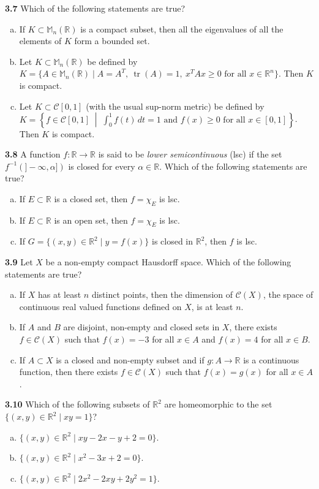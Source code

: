 \documentclass[11pt,a4paper]{article}
\newcommand{\R}{\mathbb{R}}
\newcommand{\M}{\mathbb{M}}
\newcommand{\tr}{\operatorname{tr}}
\newcommand{\qitem}[1]{\par\medskip\noindent\textbf{#1}\hspace{0.5em}}
\begin{document}
\qitem{3.7} Which of the following statements are true?
\begin{enumerate}[a.]
  \item If $K \subset \M_n(\R)$ is a compact subset, then all the eigenvalues of all the elements of $K$ form a bounded set.
  \item Let $K \subset \M_n(\R)$ be defined by $K = \{A \in \M_n(\R) \mid A = A^T,\ \tr(A) = 1,\ x^T A x \ge 0 \text{ for all } x \in \R^n\}$. Then $K$ is compact.
  \item Let $K \subset \mathcal{C}[0, 1]$ (with the usual sup-norm metric) be defined by $K = \left\{f \in \mathcal{C}[0, 1] \;\middle|\; \int_0^1 f(t)\,dt = 1 \text{ and } f(x) \ge 0 \text{ for all } x \in [0, 1]\right\}$. Then $K$ is compact.
\end{enumerate}

\qitem{3.8} A function $f : \R \to \R$ is said to be \emph{lower semicontinuous} (lsc) if the set $f^{-1}(]-\infty, \alpha])$ is closed for every $\alpha \in \R$. Which of the following statements are true?
\begin{enumerate}[a.]
  \item If $E \subset \R$ is a closed set, then $f = \chi_E$ is lsc.
  \item If $E \subset \R$ is an open set, then $f = \chi_E$ is lsc.
  \item If $G = \{(x, y) \in \R^2 \mid y = f(x)\}$ is closed in $\R^2$, then $f$ is lsc.
\end{enumerate}

\qitem{3.9} Let $X$ be a non-empty compact Hausdorff space. Which of the following statements are true?
\begin{enumerate}[a.]
  \item If $X$ has at least $n$ distinct points, then the dimension of $\mathcal{C}(X)$, the space of continuous real valued functions defined on $X$, is at least $n$.
  \item If $A$ and $B$ are disjoint, non-empty and closed sets in $X$, there exists $f \in \mathcal{C}(X)$ such that $f(x) = -3$ for all $x \in A$ and $f(x) = 4$ for all $x \in B$.
  \item If $A \subset X$ is a closed and non-empty subset and if $g : A \to \R$ is a continuous function, then there exists $f \in \mathcal{C}(X)$ such that $f(x) = g(x)$ for all $x \in A$.
\end{enumerate}

\qitem{3.10} Which of the following subsets of $\R^2$ are homeomorphic to the set $\{(x, y) \in \R^2 \mid xy = 1\}$?
\begin{enumerate}[a.]
  \item $\{(x, y) \in \R^2 \mid xy - 2x - y + 2 = 0\}$.
  \item $\{(x, y) \in \R^2 \mid x^2 - 3x + 2 = 0\}$.
  \item $\{(x, y) \in \R^2 \mid 2x^2 - 2xy + 2y^2 = 1\}$.
\end{enumerate}
\end{document}
